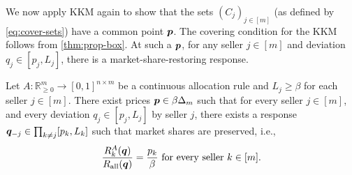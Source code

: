 We now apply KKM again to show that the sets $(C_j)_{j \in [m]}$ (as defined by \cref{eq:cover-sets})
have a common point $\bm{p}$. The covering condition for the KKM follows from \cref{thm:prop-box}.
At such a $\bm{p}$, for any seller $j \in [m]$ and deviation $q_j \in [p_j, L_j]$,
there is a market-share-restoring response.

\begin{lemma}
\label{thm:rare-exists-continuous-2}
Let $A: \mathbb{R}_{\ge 0}^m \to [0, 1]^{n \times m}$ be a continuous allocation rule
and $L_j \ge \beta$ for each seller $j \in [m]$.
%
There exist prices $\bm{p} \in \beta\Delta_m$ such that for every seller $j \in [m]$,
and every deviation $q_j \in [p_j, L_j]$ by seller $j$,
there exists a response $\bm{q}_{-j} \in \prod_{k \neq j} [p_k, L_k]$ such that
market shares are preserved, i.e.,
\[ \frac{R_k^A(\bm{q})}{R_{\operatorname{all}}(\bm{q})} = \frac{p_k}{\beta}
    \text{ for every seller } k \in [m]. \]
\end{lemma}
